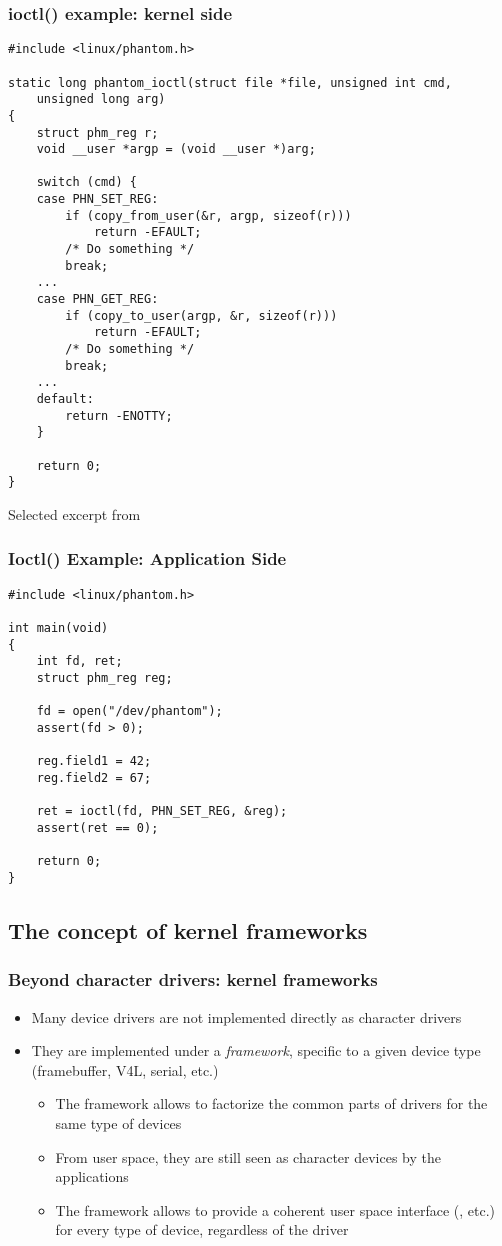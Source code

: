 \begin{frame}[fragile]
  \frametitle{ioctl() example: kernel side}
\begin{verbatim}
#include <linux/phantom.h>

static long phantom_ioctl(struct file *file, unsigned int cmd,
    unsigned long arg)
{
    struct phm_reg r;
    void __user *argp = (void __user *)arg;

    switch (cmd) {
    case PHN_SET_REG:
        if (copy_from_user(&r, argp, sizeof(r)))
            return -EFAULT;
        /* Do something */
        break;
    ...
    case PHN_GET_REG:
        if (copy_to_user(argp, &r, sizeof(r)))
            return -EFAULT;
        /* Do something */
        break;
    ...
    default:
        return -ENOTTY;
    }

    return 0;
}
\end{verbatim}
\small Selected excerpt from 
\end{frame}

\begin{frame}[fragile]
  \frametitle{Ioctl() Example: Application Side}
\begin{verbatim}
#include <linux/phantom.h>

int main(void)
{
    int fd, ret;
    struct phm_reg reg;

    fd = open("/dev/phantom");
    assert(fd > 0);

    reg.field1 = 42;
    reg.field2 = 67;

    ret = ioctl(fd, PHN_SET_REG, &reg);
    assert(ret == 0);

    return 0;
}
\end{verbatim}
\end{frame}

\subsection{The concept of kernel frameworks}

\begin{frame}
  \frametitle{Beyond character drivers: kernel frameworks}
  \begin{itemize}
  \item Many device drivers are not implemented directly as character
    drivers
  \item They are implemented under a \emph{framework}, specific to a
    given device type (framebuffer, V4L, serial, etc.)
    \begin{itemize}
    \item The framework allows to factorize the common parts of
      drivers for the same type of devices
    \item From user space, they are still seen as character devices by
      the applications
    \item The framework allows to provide a coherent user space
      interface (, etc.) for every type of device,
      regardless of the driver
    \end{itemize}
  \end{itemize}
\end{frame}


